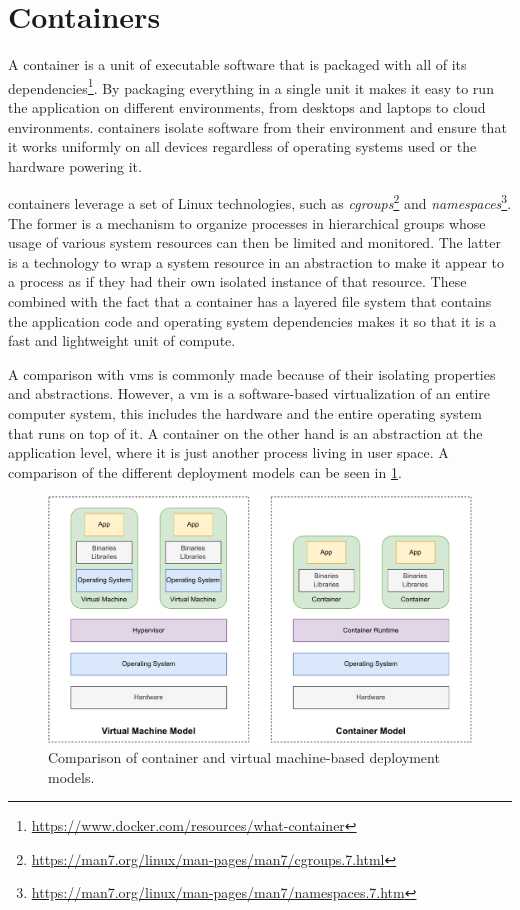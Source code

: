 \section{Containers}
\label{sec:background:containers}


A \gls{container} is a unit of executable software that is packaged with all of its dependencies\footnote{\url{https://www.docker.com/resources/what-container}}. By packaging everything in a single unit it makes it easy to run the application on different environments, from desktops and laptops to cloud environments. \Glspl{container} isolate software from their environment and ensure that it works uniformly on all devices regardless of operating systems used or the hardware powering it. 


\Glspl{container} leverage a set of Linux technologies, such as \textit{cgroups}\footnote{\url{https://man7.org/linux/man-pages/man7/cgroups.7.html}} and \textit{namespaces}\footnote{\url{https://man7.org/linux/man-pages/man7/namespaces.7.htm}}. The former is a mechanism to organize processes in hierarchical groups whose usage of various system resources can then be limited and monitored. The latter is a technology to wrap a system resource in an abstraction to make it appear to a process as if they had their own isolated instance of that resource. These combined with the fact that a container has a layered file system that contains the application code and operating system dependencies makes it so that it is a fast and lightweight unit of compute. 

A comparison with \glspl{vm} is commonly made because of their isolating properties and abstractions. However, a \gls{vm} is a software-based virtualization of an entire computer system, this includes the hardware and the entire operating system that runs on top of it. A \gls{container} on the other hand is an abstraction at the application level, where it is just another process living in user space. A comparison of the different deployment models can be seen in \cref{fig:vm-vs-container}.


\begin{figure}[!t]
    \centering
    
    \includegraphics[width=.9\linewidth]{2_background/figures/vm-vs-container.pdf}

    \caption[Container and virtual machine-based deployment models.]{Comparison of container and virtual machine-based deployment models.}
    \label{fig:vm-vs-container}
\end{figure}

